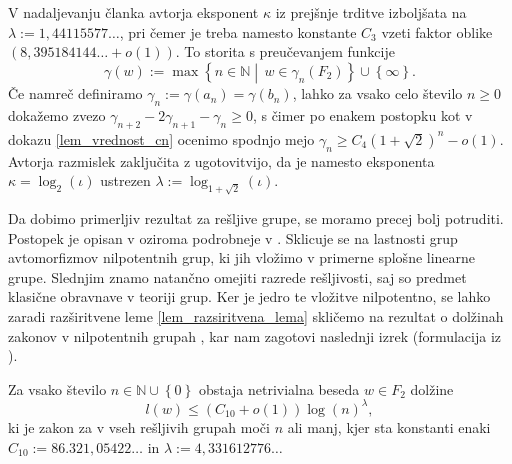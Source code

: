 V nadaljevanju članka \cite[str.~5--9]{Elkasapy_Thom_2013} avtorja eksponent $\kappa$ iz prejšnje trditve izboljšata na $\lambda := 1{,}44115577 \ldots$, pri čemer je treba namesto konstante $C_3$ vzeti faktor oblike $(8{,}395184144 \ldots + o(1))$. To storita s preučevanjem funkcije \begin{equation*}
\gamma(w) := \max \left\{ n \in  \mathbb{N}  \middle|\, w \in \gamma_{n}(F_2) \right\} \cup \left\{ \infty\right\}. 
\end{equation*}  
Če namreč definiramo $\gamma_n := \gamma(a_{n}) = \gamma(b_{n})$, lahko za vsako celo število $n \ge 0$ dokažemo zvezo $\gamma_{n + 2} - 2 \gamma_{n+1}  - \gamma_{n} \ge  0$, s čimer po enakem postopku kot v dokazu \ref{lem_vrednost_cn} ocenimo spodnjo mejo $\gamma_n \ge C_4 (1 + \sqrt{2})^{n} - o(1)$.
Avtorja razmislek zaključita z ugotovitvijo, da je namesto eksponenta $\kappa = \log_2( \iota)$ ustrezen $\lambda := \log_{1 + \sqrt{2}}(\iota)$.

Da dobimo primerljiv rezultat za rešljive grupe, se moramo precej bolj potruditi. Postopek je opisan v \cite[str.~3--4]{Thom_2015} oziroma podrobneje v \cite[str.~19--25]{Schneider_2016}. Sklicuje se na lastnosti grup avtomorfizmov nilpotentnih grup, ki jih vložimo
v primerne splošne linearne grupe. Slednjim znamo natančno omejiti razrede rešljivosti, saj so predmet klasične obravnave v teoriji grup. Ker je jedro te vložitve nilpotentno, se lahko zaradi razširitvene leme \ref{lem_razsiritvena_lema} skličemo na rezultat o dolžinah zakonov v nilpotentnih grupah \cite{trd_koncna_ugotovitev_nilpotentne_v_nalogi}, kar nam zagotovi naslednji izrek (formulacija iz \cite[str.~25]{Schneider_2016}).  

\begin{izrek}
\label{izr_glavni_izrek_resljive}
 Za vsako število $n \in  \mathbb{N} \cup  \left\{ 0\right\}$ obstaja netrivialna beseda $w \in F_2$ dolžine \begin{equation*}
 l(w) \le (C_{10} + o(1)) \log(n)^{\lambda},
 \end{equation*}  
   ki je zakon za v vseh rešljivih grupah moči $n$ ali manj, kjer sta konstanti enaki $C_{10} := 86.321{,}05422 \ldots$ in $\lambda := 4{,}331612776 \ldots$ 
\end{izrek}